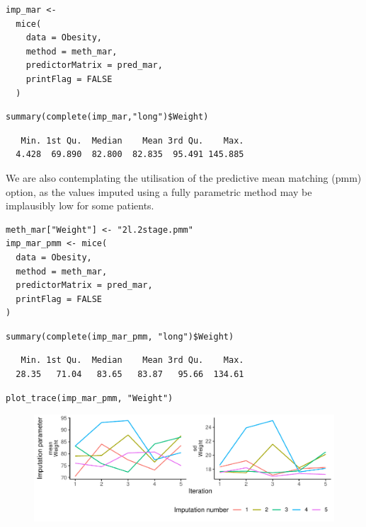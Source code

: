 \documentclass[
  article]{jss}
\begin{document}
\begin{verbatim}
imp_mar <-
  mice(
    data = Obesity,
    method = meth_mar,
    predictorMatrix = pred_mar,
    printFlag = FALSE
  )
\end{verbatim}

\begin{verbatim}
summary(complete(imp_mar,"long")$Weight)
\end{verbatim}

\begin{verbatim}
   Min. 1st Qu.  Median    Mean 3rd Qu.    Max. 
  4.428  69.890  82.800  82.835  95.491 145.885 
\end{verbatim}

We are also contemplating the utilisation of the predictive mean
matching (pmm) option, as the values imputed using a fully parametric
method may be implausibly low for some patients.

\begin{verbatim}
meth_mar["Weight"] <- "2l.2stage.pmm"
imp_mar_pmm <- mice(
  data = Obesity,
  method = meth_mar,
  predictorMatrix = pred_mar,
  printFlag = FALSE
)
\end{verbatim}

\begin{verbatim}
summary(complete(imp_mar_pmm, "long")$Weight)
\end{verbatim}

\begin{verbatim}
   Min. 1st Qu.  Median    Mean 3rd Qu.    Max. 
  28.35   71.04   83.65   83.87   95.66  134.61 
\end{verbatim}

\begin{verbatim}
plot_trace(imp_mar_pmm, "Weight")
\end{verbatim}

\begin{figure}[h]

{\centering \includegraphics{manuscript_files/figure-pdf/obesity-predmar_pmm1-1.pdf}

}

\end{figure}
\end{document}

